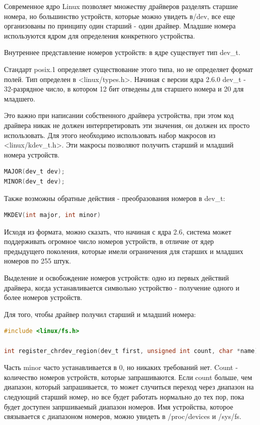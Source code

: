 \documentclass[12pt,a4paper]{scrreprt}
\begin{document}
Современное ядро Linux позволяет множеству драйверов разделять старшие номера, но большинство устройств, которые можно увидеть в/dev, все еще организованы по принципу один старший - один драйвер. Младшие номера используются ядром для определения конкретного устройства. 

Внутреннее представление номеров устройств: в ядре существует тип dev\_t.

Стандарт posix.1 определяет существование этого типа, но не определяет формат полей. Тип определен в <linux/types.h>. Начиная с версии ядра 2.6.0 dev\_t - 32-разрядное число, в котором 12 бит отведены для старшего номера и 20 для младшего. 

Это важно при написании собственного драйвера устройства, при этом код драйвера никак не должен интерпретировать эти значения, он должен их просто использовать. Для этого необходимо использовать набор макросов из <linux/kdev\_t.h>. Эти макросы позволяют получить старший и младший номера устройств.

\begin{lstlisting}[language=C]
MAJOR(dev_t dev);
MINOR(dev_t dev);
\end{lstlisting}

Также возможны обратные действия - преобразования номеров в dev\_t:

\begin{lstlisting}[language=C]
MKDEV(int major, int minor)
\end{lstlisting}

Исходя из формата, можно сказать, что начиная с ядра 2.6, система может поддерживать огромное число номеров устройств, в отличие от ядер предыдущего поколения, которые имели ограничения для старших и младших номеров по 255 штук.

Выделение и освобождение номеров устройств: одно из первых действий драйвера, когда устанавливается символьно устройство - получение одного и более номеров устройств.

Для того, чтобы драйвер получил старший и младший номера:
\begin{lstlisting}[language=C]
#include <linux/fs.h>

int register_chrdev_region(dev_t first, unsigned int count, char *name);
\end{lstlisting}

Часть minor часто устанавливается в 0, но никаких требований нет. Count - количество номеров устройств, которые запрашиваются. Если count больше, чем диапазон, который запрашивается, то может случиться переход через диапазон на следующий старший номер, но все будет работать нормально до тех пор, пока будет доступен запршиваемый диапазон номеров. Имя устройства, которое связывается с диапазоном номеров, можно увидеть в /proc/devices и /sys/fs.
\end{document}
